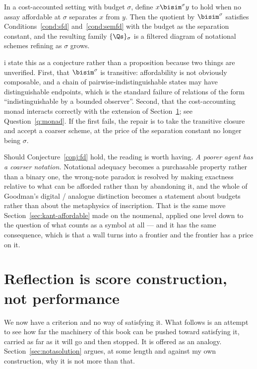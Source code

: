 \begin{conjecture}
\label{conj:fd}
In a cost-accounted setting with budget $\sigma$, define
$x \bisim^{\sigma} y$ to hold when no assay affordable at $\sigma$
separates $x$ from $y$.
Then the quotient by $\bisim^{\sigma}$ satisfies
Conditions~\ref{cond:sfd} and~\ref{cond:semfd} with the budget as
the separation constant, and the resulting family
$\{\Qs\}_{\sigma}$ is a filtered diagram of notational schemes
refining as $\sigma$ grows.
\end{conjecture}

\noindent
i state this as a conjecture rather than a proposition because two
things are unverified.
First, that $\bisim^{\sigma}$ is transitive: affordability is not
obviously composable, and a chain of pairwise-indistinguishable
states may have distinguishable endpoints, which is the standard
failure of relations of the form ``indistinguishable by a bounded
observer''.
Second, that the cost-accounting monad interacts correctly with the
extension of Section~\ref{sec:rho-builtins}; see
Question~\ref{q:monad}.
If the first fails, the repair is to take the transitive closure
and accept a coarser scheme, at the price of the separation
constant no longer being $\sigma$.

Should Conjecture~\ref{conj:fd} hold, the reading is worth having.
\emph{A poorer agent has a coarser notation.}
Notational adequacy becomes a purchasable property rather than a
binary one, the wrong-note paradox is resolved by making exactness
relative to what can be afforded rather than by abandoning it, and
the whole of Goodman's digital / analogue distinction becomes a
statement about budgets rather than about the metaphysics of
inscription.
That is the same move
Section~\ref{sec:kant-affordable} made on the noumenal, applied one
level down to the question of what counts as a symbol at all --- and
it has the same consequence, which is that a wall turns into a
frontier and the frontier has a price on it.

\section{Reflection is score construction, not performance}
\label{sec:rho-builtins}

We now have a criterion and no way of satisfying it.
What follows is an attempt to see how far the machinery of this
book can be pushed toward satisfying it, carried as far as it will
go and then stopped.
It is offered as an analogy.
Section~\ref{sec:notasolution} argues, at some length and against
my own construction, why it is not more than that.

